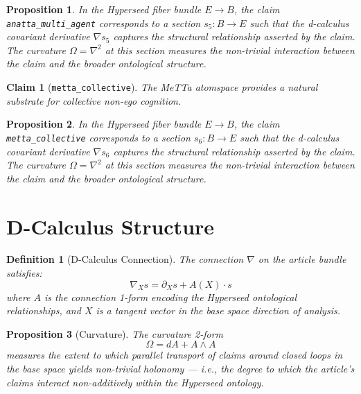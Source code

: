 \documentclass{article}
\newtheorem{claim}{Claim}
\newtheorem{definition}{Definition}
\newtheorem{proposition}{Proposition}
\begin{document}
\begin{proposition}
In the Hyperseed fiber bundle $E \to B$, the claim \texttt{anatta_multi_agent} corresponds to a section $s_5: B \to E$ such that the d-calculus covariant derivative $\nabla s_5$ captures the structural relationship asserted by the claim. The curvature $\Omega = \nabla^2$ at this section measures the non-trivial interaction between the claim and the broader ontological structure.
\end{proposition}

\begin{claim}[\texttt{metta_collective}]
The MeTTa atomspace provides a natural substrate for collective non-ego cognition.
\end{claim}

\begin{proposition}
In the Hyperseed fiber bundle $E \to B$, the claim \texttt{metta_collective} corresponds to a section $s_6: B \to E$ such that the d-calculus covariant derivative $\nabla s_6$ captures the structural relationship asserted by the claim. The curvature $\Omega = \nabla^2$ at this section measures the non-trivial interaction between the claim and the broader ontological structure.
\end{proposition}

\section{D-Calculus Structure}

\begin{definition}[D-Calculus Connection]
The connection $\nabla$ on the article bundle satisfies:
\begin{equation}
  \nabla_X s = \partial_X s + A(X) \cdot s
\end{equation}
where $A$ is the connection 1-form encoding the Hyperseed ontological relationships, and $X$ is a tangent vector in the base space direction of analysis.
\end{definition}

\begin{proposition}[Curvature]
The curvature 2-form
\begin{equation}
  \Omega = dA + A \wedge A
\end{equation}
measures the extent to which parallel transport of claims around closed loops in the base space yields non-trivial holonomy --- i.e., the degree to which the article's claims interact non-additively within the Hyperseed ontology.
\end{proposition}
\end{document}
